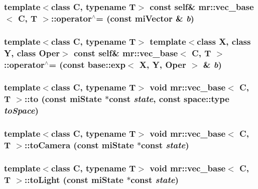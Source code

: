 \subsubsection{\setlength{\rightskip}{0pt plus 5cm}template$<$class C, typename T$>$ const {\bf self}\& {\bf mr::vec\_\-base}$<$ C, T $>$::operator$^\wedge$= (const mi\-Vector \& {\em b})\hspace{0.3cm}{\tt  [inline]}}\label{structmr_1_1vec__base_z62_1}


\subsubsection{\setlength{\rightskip}{0pt plus 5cm}template$<$class C, typename T$>$ template$<$class X, class Y, class Oper$>$ const {\bf self}\& {\bf mr::vec\_\-base}$<$ C, T $>$::operator$^\wedge$= (const {\bf base::exp}$<$ X, Y, Oper $>$ \& {\em b})\hspace{0.3cm}{\tt  [inline]}}\label{structmr_1_1vec__base_z62_0}


\subsubsection{\setlength{\rightskip}{0pt plus 5cm}template$<$class C, typename T$>$ void {\bf mr::vec\_\-base}$<$ C, T $>$::to (const mi\-State $\ast$const {\em state}, const {\bf space::type} {\em to\-Space})\hspace{0.3cm}{\tt  [inline]}}\label{structmr_1_1vec__base_a13}


\subsubsection{\setlength{\rightskip}{0pt plus 5cm}template$<$class C, typename T$>$ void {\bf mr::vec\_\-base}$<$ C, T $>$::to\-Camera (const mi\-State $\ast$const {\em state})\hspace{0.3cm}{\tt  [inline]}}\label{structmr_1_1vec__base_a3}


\subsubsection{\setlength{\rightskip}{0pt plus 5cm}template$<$class C, typename T$>$ void {\bf mr::vec\_\-base}$<$ C, T $>$::to\-Light (const mi\-State $\ast$const {\em state})\hspace{0.3cm}{\tt  [inline]}}\label{structmr_1_1vec__base_a6}


